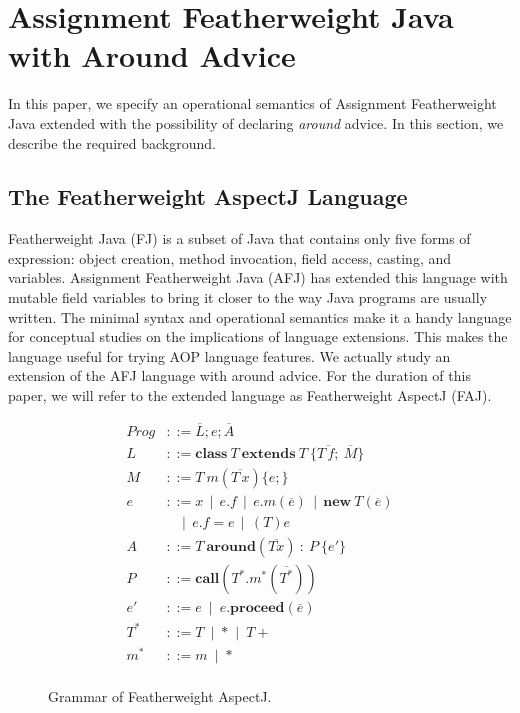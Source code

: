 \section{Assignment Featherweight Java with Around Advice}\label{sec:FAJ}

In this paper, we specify an operational semantics of Assignment Featherweight Java extended with the possibility of declaring \emph{around} advice. In this section, we describe the required background.\\

\subsection{The Featherweight AspectJ Language}
Featherweight Java (FJ) \cite{Igarashi99featherweightjava:} is a subset of Java that contains only five forms of expression: object creation, method invocation, field access, casting, and variables. Assignment Featherweight Java (AFJ) \cite{FJA} has extended this language with mutable field variables to bring it closer to the way Java programs are usually written. The minimal syntax and operational semantics make it a handy language for conceptual studies on the implications of language extensions. This makes the language useful for trying AOP language features. We actually study an extension of the AFJ language with around advice. For the duration of this paper, we will refer to the extended language as Featherweight AspectJ (FAJ).\\

\begin{figure}[ht]
\begin{align*}
Prog&::=\overline{L};e;\overline{A}\\
L&::= \textbf{class} \: T \: \textbf{extends} \: T \: \{ \overline{T\,f;} \: \overline{M} \}\\
M&::= T \: m(\overline{T \, x})\{e;\}\\
e&::= x \, \mid \, e.f \, \mid \, e.m(\overline{e}) \, \mid \, \textbf{new} \: T(\overline{e})\\
&\;\;\; \mid \, e.f=e \, \mid \, (T)e\\
A&::= T \: \textbf{around} (\overline{Tx}) \: : \: P \: \{e'\}\\
P&::= \textbf{call}(T^*.m^*(\overline{T^*}))\\
e'&::= e \: \mid \: e.\textbf{proceed}(\overline{e})\\
T^*&::= T \: \mid \: \textbf{*} \: \mid \: T+\\
m^* &::= m \: \mid \: \textbf{*}\\
\end{align*}
\caption{Grammar of Featherweight AspectJ.}
\label{fig:fja}
\end{figure}

